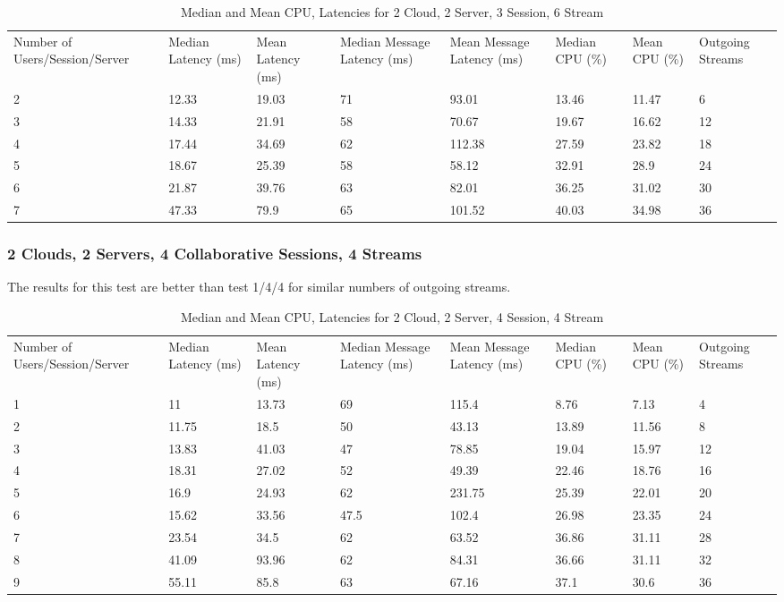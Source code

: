 \begin{table}
\caption{Median and Mean CPU, Latencies for 2 Cloud, 2 Server, 3 Session, 6 Stream}
\label{table:2cld_2serv_3sess_6str}
\begin{tabu} to\linewidth{|X[c]|X[c]|X[c]|X[c]|X[c]|X[c]|X[c]|X[c]|}
\everyrow{\hline}
\hline
Number of Users/Session/Server & Median Latency (ms) & Mean Latency (ms) & Median Message Latency (ms) & Mean Message Latency (ms) & Median CPU (\%) & Mean CPU (\%) & Outgoing Streams\\
2 & 12.33 & 19.03 & 71 & 93.01 & 13.46 & 11.47 & 6 \\
3 & 14.33 & 21.91 & 58 & 70.67 & 19.67 & 16.62 & 12 \\
4 & 17.44 & 34.69 & 62 & 112.38 & 27.59 & 23.82 & 18 \\
5 & 18.67 & 25.39 & 58 & 58.12 & 32.91 & 28.9 & 24 \\
6 & 21.87 & 39.76 & 63 & 82.01 & 36.25 & 31.02 & 30 \\
7 & 47.33 & 79.9 & 65 & 101.52 & 40.03 & 34.98 & 36 \\
\end{tabu}
\end{table}

\subsubsection{2 Clouds, 2 Servers, 4 Collaborative Sessions, 4 Streams}

The results for this test are better than test 1/4/4 for similar numbers of outgoing streams.

\begin{table}
\caption{Median and Mean CPU, Latencies for 2 Cloud, 2 Server, 4 Session, 4 Stream}
\label{table:2cld_2serv_4sess_4str}
\begin{tabu} to\linewidth{|X[c]|X[c]|X[c]|X[c]|X[c]|X[c]|X[c]|X[c]|}
\everyrow{\hline}
\hline
Number of Users/Session/Server & Median Latency (ms) & Mean Latency (ms) & Median Message Latency (ms) & Mean Message Latency (ms) & Median CPU (\%) & Mean CPU (\%) & Outgoing Streams\\
1 & 11 & 13.73 & 69 & 115.4 & 8.76 & 7.13 & 4 \\
2 & 11.75 & 18.5 & 50 & 43.13 & 13.89 & 11.56 & 8 \\
3 & 13.83 & 41.03 & 47 & 78.85 & 19.04 & 15.97 & 12 \\
4 & 18.31 & 27.02 & 52 & 49.39 & 22.46 & 18.76 & 16 \\
5 & 16.9 & 24.93 & 62 & 231.75 & 25.39 & 22.01 & 20 \\
6 & 15.62 & 33.56 & 47.5 & 102.4 & 26.98 & 23.35 & 24 \\
7 & 23.54 & 34.5 & 62 & 63.52 & 36.86 & 31.11 & 28 \\
8 & 41.09 & 93.96 & 62 & 84.31 & 36.66 & 31.11 & 32 \\
9 & 55.11 & 85.8 & 63 & 67.16 & 37.1 & 30.6 & 36 \\
\end{tabu}
\end{table}

